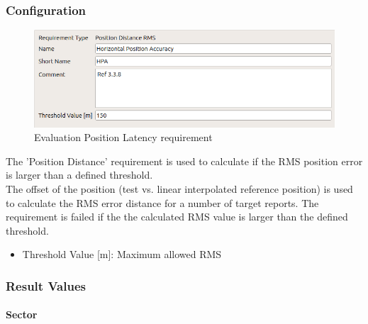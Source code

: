 \subsubsection{Configuration}

\begin{figure}[H]
    \includegraphics[width=14cm,frame]{figures/eval_req_pos_distance_rms.png}
  \caption{Evaluation Position Latency requirement}
\end{figure}

The 'Position Distance' requirement is used to calculate if the RMS position error is larger than a defined threshold. \\

The offset of the position (test vs. linear interpolated reference position) is used to calculate the RMS error distance for a number of target reports. The requirement is failed if the the calculated RMS value is larger than the defined threshold. \\

\begin{itemize}  
\item Threshold Value [m]: Maximum allowed RMS
\end{itemize}

\subsubsection{Result Values}

\paragraph{Sector}

